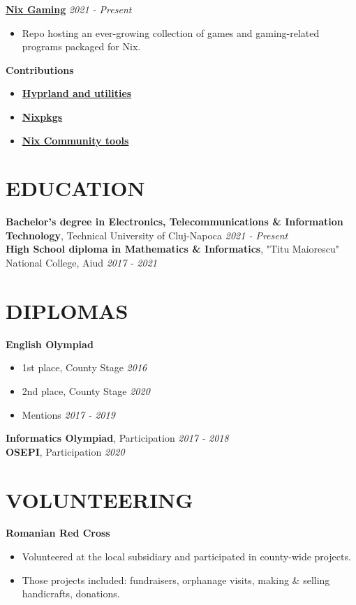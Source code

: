 \documentclass[margin]{res}
\begin{document}
\begin{resume}
  {\bf \href{https://github.com/fufexan/nix-gaming}{Nix Gaming}} \hfill \textit{2021 - Present}\\
  \begin{itemize}
    \item Repo hosting an ever-growing collection of games and gaming-related programs packaged for Nix.
  \end{itemize}

  {\bf Contributions}
  \begin{itemize}
    \item \href {https://github.com/hyprwm}{\textbf{Hyprland and utilities}}
    \item \href {https://github.com/nixos/nixpkgs}{\textbf{Nixpkgs}}
    \item \href {https://github.com/nix-community}{\textbf{Nix Community tools}}
  \end{itemize}

  \section{EDUCATION}
  {\bf Bachelor's degree in Electronics, Telecommunications \& Information Technology}, Technical University of Cluj-Napoca \hfill \textit{2021 - Present}\\
  {\bf High School diploma in Mathematics \& Informatics}, "Titu Maiorescu" National College, Aiud \hfill \textit{2017 - 2021}\\

  \section{DIPLOMAS}
  {\bf English Olympiad}
  \begin{itemize}\itemsep -6pt
    \item 1st place, County Stage \hfill \textit{2016}\\
    \item 2nd place, County Stage \hfill \textit{2020}\\
    \item Mentions \hfill \textit{2017 - 2019}\\
  \end{itemize}
  {\bf Informatics Olympiad}, Participation \hfill \textit{2017 - 2018}\\
  {\bf OSEPI}, Participation \hfill \textit{2020}\\

  \section{VOLUNTEERING}
  \hspace{4mm}
  {\bf Romanian Red Cross}
  \begin{itemize}
    \item Volunteered at the local subsidiary and participated in county-wide projects.
    \item Those projects included: fundraisers, orphanage visits, making \& selling handicrafts, donations.
  \end{itemize}


\end{resume}
\end{document}
